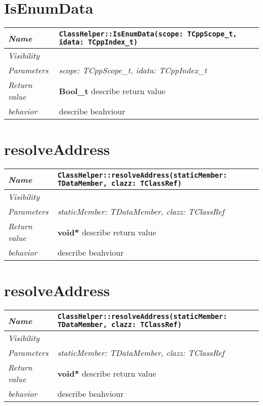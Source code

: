  \section{IsEnumData}
\begin{longtable}{p{3cm} @{\hskip 1cm} p{12cm}}
 \hline
\textit{Name} & \texttt{ClassHelper::IsEnumData(scope: TCppScope_t, idata: TCppIndex_t)}\\
\hline
 \textit{Visibility} & \\
\hline
\textit{Parameters} & \textit{scope: TCppScope_t, idata: TCppIndex_t}\\
\hline
\textit{Return value} & \textbf{ Bool_t} describe return value\\
  \hline
 \textit{behavior} & describe beahviour \\
\hline
\end{longtable} \pagebreak
 \section{resolveAddress}
\begin{longtable}{p{3cm} @{\hskip 1cm} p{12cm}}
 \hline
\textit{Name} & \texttt{ClassHelper::resolveAddress(staticMember: TDataMember, clazz: TClassRef)}\\
\hline
 \textit{Visibility} & \\
\hline
\textit{Parameters} & \textit{staticMember: TDataMember, clazz: TClassRef}\\
\hline
\textit{Return value} & \textbf{ void*} describe return value\\
  \hline
 \textit{behavior} & describe beahviour \\
\hline
\end{longtable} \pagebreak
 \section{resolveAddress}
\begin{longtable}{p{3cm} @{\hskip 1cm} p{12cm}}
 \hline
\textit{Name} & \texttt{ClassHelper::resolveAddress(staticMember: TDataMember, clazz: TClassRef)}\\
\hline
 \textit{Visibility} & \\
\hline
\textit{Parameters} & \textit{staticMember: TDataMember, clazz: TClassRef}\\
\hline
\textit{Return value} & \textbf{ void*} describe return value\\
  \hline
 \textit{behavior} & describe beahviour \\
\hline
\end{longtable} \pagebreak
